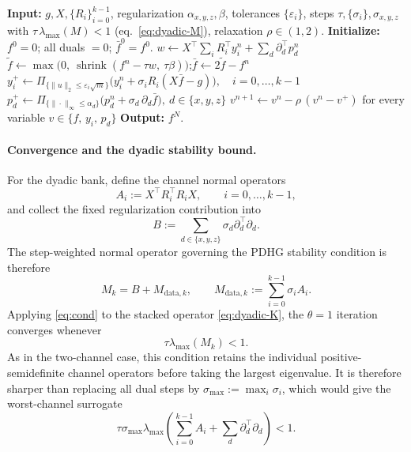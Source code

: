 \documentclass{article}
\begin{document}
\begin{algorithm}[t]
\caption{Dyadic $k$-channel PDHG (He--Yuan relaxed)}
\label{alg:dyadic}
\begin{algorithmic}[1]
\State \textbf{Input:} $g,X,\{R_i\}_{i=0}^{k-1}$, regularization $\alpha_{x,y,z},\beta$, tolerances $\{\varepsilon_i\}$, steps $\tau,\{\sigma_i\},\sigma_{x,y,z}$ with $\tau\,\lambda_{\max}(M)<1$ (eq.~\eqref{eq:dyadic-M}), relaxation $\rho\in(1,2)$.
\State \textbf{Initialize:} $f^{0}=0$; all duals $=0$; $\bar f^{0}=f^{0}$.
  \State $w\gets X^\top\!\sum_{i}R_{i}^\top y_{i}^{n}+\sum_d\partial_d^\top p_d^{n}$
  \State $\tilde f\gets \max\!\bigl(0,\ \operatorname{shrink}(f^{n}-\tau w,\ \tau\beta)\bigr)$;\quad $\bar f\gets 2\tilde f-f^{n}$ 
  \State $y_{i}^{+}\gets \Pi_{\{\|u\|_2\le\varepsilon_i\sqrt m\}}\!\bigl(y_{i}^{n}+\sigma_{i}R_{i}(X\bar f-g)\bigr),\quad i=0,\dots,k-1$
  \State $p_{d}^{+}\gets \Pi_{\{\|\cdot\|_\infty\le\alpha_d\}}\!\bigl(p_{d}^{n}+\sigma_{d}\,\partial_d\bar f\bigr),\ d\in\{x,y,z\}$
  \State $v^{n+1}\gets v^{n}-\rho\,(v^{n}-v^{+})$ for every variable $v\in\{f,\,y_i,\,p_d\}$ 
\EndFor
\State \textbf{Output:} $f^{N}$.
\end{algorithmic}
\end{algorithm}

\paragraph{Convergence and the dyadic stability bound.}

For the dyadic bank, define the channel normal operators
\[
A_i
:=
X^\top R_i^\top R_iX,
\qquad
i=0,\ldots,k-1,
\]
and collect the fixed regularization contribution into
\[
B
:=
\sum_{d\in\{x,y,z\}}
\sigma_d\partial_d^\top\partial_d.
\]
The step-weighted normal operator governing the PDHG stability
condition is therefore
\begin{equation}
\label{eq:dyadic-M}
M_k
=
B+M_{\mathrm{data},k},
\qquad
M_{\mathrm{data},k}
:=
\sum_{i=0}^{k-1}\sigma_iA_i.
\end{equation}
Applying \eqref{eq:cond} to the stacked operator \eqref{eq:dyadic-K}, the $\theta=1$ iteration converges whenever
\begin{equation}
\label{eq:dyadic-cond}
\tau\lambda_{\max}(M_k)<1.
\end{equation}
As in the two-channel case, this condition retains the individual
positive-semidefinite channel operators before taking the largest
eigenvalue.  It is therefore sharper than replacing all dual steps
by $\sigma_{\max}:=\max_i\sigma_i$, which would give the
worst-channel surrogate
\[
\tau\sigma_{\max}
\lambda_{\max}
\left(
\sum_{i=0}^{k-1}A_i
+
\sum_d\partial_d^\top\partial_d
\right)<1.
\]
\end{document}
